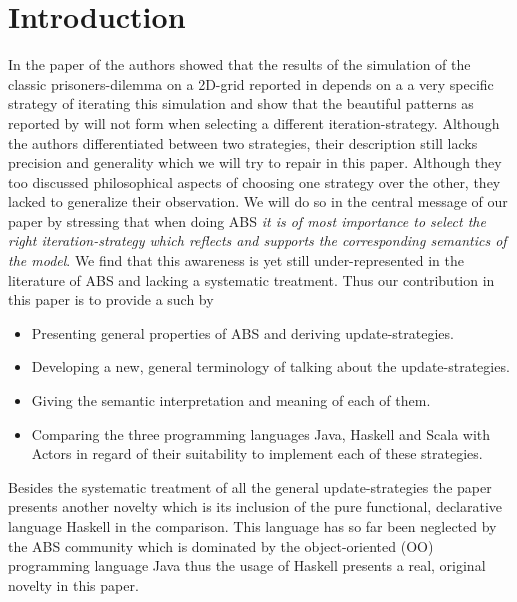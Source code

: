 \section{Introduction}
In the paper of \cite{huberman_evolutionary_1993} the authors showed that the results of the simulation of the classic prisoners-dilemma on a 2D-grid reported in \cite{nowak_evolutionary_1992} depends on a a very specific strategy of iterating this simulation and show that the beautiful patterns as reported by \cite{nowak_evolutionary_1992} will not form when selecting a different iteration-strategy. Although the authors differentiated between two strategies, their description still lacks precision and generality which we will try to repair in this paper. Although they too discussed philosophical aspects of choosing one strategy over the other, they lacked to generalize their observation. We will do so in the central message of our paper by stressing that when doing ABS \textit{it is of most importance to select the right iteration-strategy which reflects and supports the corresponding semantics of the model}. We find that this awareness is yet still under-represented in the literature of ABS and lacking a systematic treatment. Thus our contribution in this paper is to provide a such by
\begin{itemize}
	\item Presenting general properties of ABS and deriving update-strategies.
	\item Developing a new, general terminology of talking about the update-strategies.
	\item Giving the semantic interpretation and meaning of each of them.
	\item Comparing the three programming languages Java, Haskell and Scala with Actors in regard of their suitability to implement each of these strategies.
\end{itemize}

Besides the systematic treatment of all the general update-strategies the paper presents another novelty which is its inclusion of the pure functional, declarative language Haskell in the comparison. This language has so far been neglected by the ABS community which is dominated by the object-oriented (OO) programming language Java thus the usage of Haskell presents a real, original novelty in this paper.